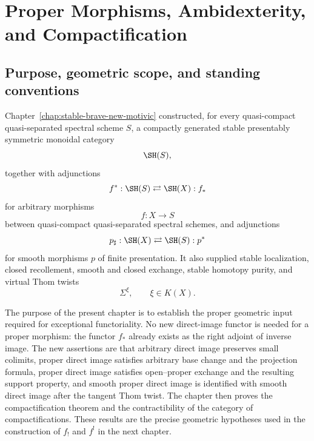 \chapter{Proper Morphisms, Ambidexterity, and Compactification}
\label{chap:proper-ambidexterity-compactification}

\section{Purpose, geometric scope, and standing conventions}
\label{sec:proper-purpose}

Chapter~\ref{chap:stable-brave-new-motivic} constructed, for every
quasi-compact quasi-separated spectral scheme \(S\), a compactly generated
stable presentably symmetric monoidal category
\[
    \SH(S),
\]
together with adjunctions
\[
    f^*:\SH(S)\rightleftarrows\SH(X):f_*
\]
for arbitrary morphisms
\[
    f:X\longrightarrow S
\]
between quasi-compact quasi-separated spectral schemes, and adjunctions
\[
    p_\sharp:\SH(X)\rightleftarrows\SH(S):p^*
\]
for smooth morphisms \(p\) of finite presentation.  It also supplied stable
localization, closed recollement, smooth and closed exchange, stable homotopy
purity, and virtual Thom twists
\[
    \Sigma^\xi,
    \qquad
    \xi\in K(X).
\]

The purpose of the present chapter is to establish the proper geometric input
required for exceptional functoriality.  No new direct-image functor is needed
for a proper morphism: the functor \(f_*\) already exists as the right adjoint
of inverse image.  The new assertions are that arbitrary direct image preserves small
colimits, proper direct image satisfies arbitrary base change and the
projection formula, proper direct image satisfies open--proper exchange and
the resulting support property, and smooth proper direct image is identified
with smooth direct image after the tangent Thom twist.  The chapter then
proves the compactification theorem and the contractibility of the category
of compactifications.  These results are the precise geometric hypotheses
used in the construction of \(f_!\) and \(f^!\) in the next chapter.

